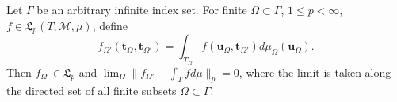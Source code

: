 Let $\Gamma$ be an arbitrary infinite index set. For finite $\Omega \subset \Gamma$, $1 \leq p < \infty$, $f \in \mathfrak{L}_p(T,\mathcal{M},\mu)$, define
$$f_{\Omega'}(\mathbf{t}_\Omega, \mathbf{t}_{\Omega'}) = \int_{T_\Omega} f(\mathbf{u}_\Omega, \mathbf{t}_{\Omega'}) d\mu_\Omega(\mathbf{u}_\Omega).$$
Then $f_{\Omega'} \in \mathfrak{L}_p$ and $\lim_\Omega \|f_{\Omega'} - \int_T f d\mu\|_p = 0$, where the limit is taken along the directed set of all finite subsets $\Omega \subset \Gamma$.
